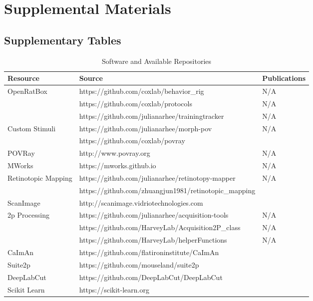 \chapter{Supplemental Materials}
\label{supplementals}


\section{Supplementary Tables}

\begin{table}[h]
  \caption{Software and Available Repositories}
  \centering
  \footnotesize
  \begin{tabular}{ p{1.8cm}p{7.7cm}p{3.9cm}  }
    \toprule
    Resource & Source & Publications \\
    \midrule
    OpenRatBox  & https://github.com/coxlab/behavior\_rig & N/A \\ 
                & https://github.com/coxlab/protocols & N/A \\ 
                & https://github.com/julianarhee/trainingtracker & N/A \\ 
    \midrule
    Custom Stimuli & https://github.com/julianarhee/morph-pov & N/A \\
                   & https://github.com/coxlab/povray & \citet{Zoccolan2009} \\
    POVRay  & http://www.povray.org & N/A \\
    MWorks  & https://mworks.github.io & N/A \\
    \midrule
    Retinotopic Mapping & https://github.com/julianarhee/retinotopy-mapper & N/A \\ 
                        & https://github.com/zhuangjun1981/retinotopic\_mapping & \citealt{Zhuang2017}\\
    \midrule
    ScanImage   & http://scanimage.vidriotechnologies.com & \citet{Pologruto2003} \\ 
    \midrule
    2p Processing  & https://github.com/julianarhee/acquisition-tools & N/A \\ 
                   & https://github.com/HarveyLab/Acquisition2P\_class & N/A \\
                   & https://github.com/HarveyLab/helperFunctions & N/A \\
    CaImAn & https://github.com/flatironinstitute/CaImAn  & \citet{Giovannucci2019,Pnevmatikakis2019} \\
    Suite2p & https://github.com/mouseland/suite2p & \cite{Pachitariu2017} \\
    \midrule
    DeepLabCut   & https://github.com/DeepLabCut/DeepLabCut & \citet{Mathis2018,Nath2019} \\
    \midrule
    Scikit Learn   & https://scikit-learn.org & \citet{Pedregosa2011} \\
    \bottomrule
  \end{tabular}
  \label{tab:software}
\end{table}

